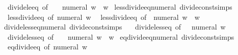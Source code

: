 \begin{isabellebody}
\ \ divide{\isacharunderscore}{\kern0pt}le{\isacharunderscore}{\kern0pt}eq\ {\isacharbrackleft}{\kern0pt}of\ {\isacharunderscore}{\kern0pt}\ {\isacharunderscore}{\kern0pt}\ {\isachardoublequoteopen}{\isacharminus}{\kern0pt}\ numeral\ w{\isachardoublequoteclose}{\isacharbrackright}{\kern0pt}\ \ w\isanewline
\isanewline
{}\isamarkupfalse%
\ less{\isacharunderscore}{\kern0pt}divide{\isacharunderscore}{\kern0pt}eq{\isacharunderscore}{\kern0pt}numeral\ {\isacharbrackleft}{\kern0pt}divide{\isacharunderscore}{\kern0pt}const{\isacharunderscore}{\kern0pt}simps{\isacharbrackright}{\kern0pt}\ {\isacharequal}{\kern0pt}\isanewline
\ \ less{\isacharunderscore}{\kern0pt}divide{\isacharunderscore}{\kern0pt}eq\ {\isacharbrackleft}{\kern0pt}of\ {\isachardoublequoteopen}numeral\ w{\isachardoublequoteclose}{\isacharbrackright}{\kern0pt}\isanewline
\ \ less{\isacharunderscore}{\kern0pt}divide{\isacharunderscore}{\kern0pt}eq\ {\isacharbrackleft}{\kern0pt}of\ {\isachardoublequoteopen}{\isacharminus}{\kern0pt}\ numeral\ w{\isachardoublequoteclose}{\isacharbrackright}{\kern0pt}\ \ w\isanewline
\isanewline
{}\isamarkupfalse%
\ divide{\isacharunderscore}{\kern0pt}less{\isacharunderscore}{\kern0pt}eq{\isacharunderscore}{\kern0pt}numeral\ {\isacharbrackleft}{\kern0pt}divide{\isacharunderscore}{\kern0pt}const{\isacharunderscore}{\kern0pt}simps{\isacharbrackright}{\kern0pt}\ {\isacharequal}{\kern0pt}\isanewline
\ \ divide{\isacharunderscore}{\kern0pt}less{\isacharunderscore}{\kern0pt}eq\ {\isacharbrackleft}{\kern0pt}of\ {\isacharunderscore}{\kern0pt}\ {\isacharunderscore}{\kern0pt}\ {\isachardoublequoteopen}numeral\ w{\isachardoublequoteclose}{\isacharbrackright}{\kern0pt}\isanewline
\ \ divide{\isacharunderscore}{\kern0pt}less{\isacharunderscore}{\kern0pt}eq\ {\isacharbrackleft}{\kern0pt}of\ {\isacharunderscore}{\kern0pt}\ {\isacharunderscore}{\kern0pt}\ {\isachardoublequoteopen}{\isacharminus}{\kern0pt}\ numeral\ w{\isachardoublequoteclose}{\isacharbrackright}{\kern0pt}\ \ w\isanewline
\isanewline
{}\isamarkupfalse%
\ eq{\isacharunderscore}{\kern0pt}divide{\isacharunderscore}{\kern0pt}eq{\isacharunderscore}{\kern0pt}numeral\ {\isacharbrackleft}{\kern0pt}divide{\isacharunderscore}{\kern0pt}const{\isacharunderscore}{\kern0pt}simps{\isacharbrackright}{\kern0pt}\ {\isacharequal}{\kern0pt}\isanewline
\ \ eq{\isacharunderscore}{\kern0pt}divide{\isacharunderscore}{\kern0pt}eq\ {\isacharbrackleft}{\kern0pt}of\ {\isachardoublequoteopen}numeral\ w{\isachardoublequoteclose}{\isacharbrackright}{\kern0pt}\isanewline

\end{isabellebody}
